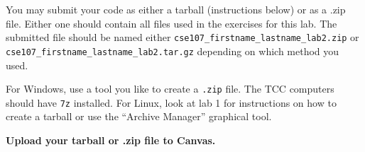 \documentclass[11pt]{cselabheader}
\begin{document}
You may submit your code as either a tarball (instructions below) or as a .zip
file. Either one should contain all files used in the exercises for this lab.
The submitted file should be named either
\texttt{cse107\_firstname\_lastname\_lab2.zip} or
\texttt{cse107\_firstname\_lastname\_lab2.tar.gz} depending on which method you
used.

For Windows, use a tool you like to create a \texttt{.zip} file. The TCC computers should
have \texttt{7z} installed. For Linux, look at lab 1 for instructions on how to
create a tarball or use the ``Archive Manager'' graphical tool.

\begin{center}
  \textbf{Upload your tarball or .zip file to Canvas.}
\end{center}
\end{document}
